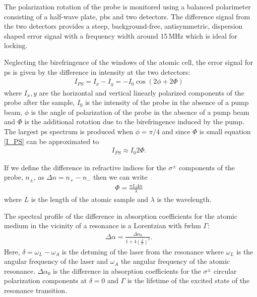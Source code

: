 \documentclass{article}
\begin{document}
\begin{multicols}{2}
The polarization rotation of the probe is monitored using a balanced polarimeter consisting of a half-wave plate, \gls*{pbs} and two detectors. The difference signal from the two detectors provides a steep, background-free, antisymmetric, dispersion shaped error signal with a frequency width around 15\,MHz which is ideal for locking\cite{pearman_polarization_2002}.

Neglecting the birefringence of the windows of the atomic cell, the error signal for \gls*{ps} is given by the difference in intensity at the two detectors\cite{pearman_polarization_2002}:
\begin{align}
I_{PS} = I_x-I_y = -I_0 \cos(2\phi+2\Phi)\label{I_PS}
\end{align}
where $I_x,y$ are the horizontal and vertical linearly polarized components of the probe after the sample, $I_0$ is the intensity of the probe in the absence of a pump beam, $\phi$ is the angle of polarization of the probe in the absence of a pump beam and $\Phi$ is the additional rotation due to the birefringence induced by the pump. The largest \gls*{ps} spectrum is produced when $\phi=\pi/4$ and since $\Phi$ is small equation \ref{I_PS} can be approximated to
\begin{align}
I_{PS} \approx I_0 2\Phi.
\end{align}

If we define the difference in refractive indices for the $\sigma^\pm$ components of the probe, $n_\pm$, as $\Delta n = n_+ - n_-$ then we can write\cite{hecht_optics_1987}
\begin{align}
\Phi = \frac{\pi L \Delta n}{\lambda}
\end{align}
where $L$ is the length of the atomic sample and $\lambda$ is the wavelength.

The spectral profile of the difference in absorption coefficients for the atomic medium in the vicinity of a resonance is a Lorentzian with \gls*{fwhm} $\Gamma$\cite{demtroder_laser_2003}:
\begin{align}
\Delta \alpha = \frac{\Delta\alpha_0}{1+4\left(\frac{\delta}{\Gamma}\right)^2}.
\end{align}
Here, $\delta=\omega_L-\omega_A$ is the detuning of the laser from the resonance where $\omega_L$ is the angular frequency of the laser and $\omega_A$ the angular frequency of the atomic resonance. $\Delta\alpha_0$ is the difference in absorption coefficients for the $\sigma^\pm$ circular polarization components at $\delta=0$ and $\Gamma$ is the lifetime of the excited state of the resonance transition.


\end{multicols}
\end{document}
